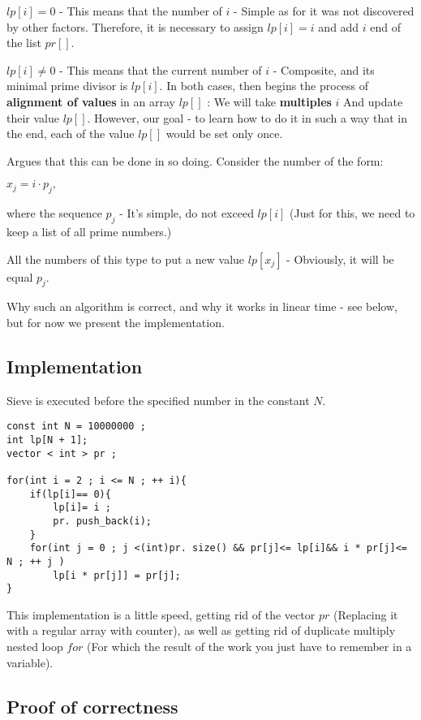 $lp [i] = 0$ - This means that the number of $i$ - Simple as for it was not discovered by other factors.
Therefore, it is necessary to assign $lp [i] = i$ and add $i$ end of the list $pr []$.

$lp [i] \ne 0$ - This means that the current number of $i$ - Composite, and its minimal prime divisor is $lp [i]$.
In both cases, then begins the process of \textbf{alignment of values} ​​in an array $lp []$ : We will take \textbf{multiples} $i$ And update their value $lp []$. However, our goal - to learn how to do it in such a way that in the end, each of the value $lp []$ would be set only once.

Argues that this can be done in so doing. Consider the number of the form:

$x_j = i \cdot p_j,$

where the sequence $p_j$ - It's simple, do not exceed $lp [i]$ (Just for this, we need to keep a list of all prime numbers.)

All the numbers of this type to put a new value $lp [x_j]$ - Obviously, it will be equal $p_j$.

Why such an algorithm is correct, and why it works in linear time - see below, but for now we present the implementation.

\subsection{ Implementation }

Sieve is executed before the specified number in the constant $N$.

\begin{verbatim}
const int N = 10000000 ;
int lp[N + 1];
vector < int > pr ;
 
for(int i = 2 ; i <= N ; ++ i){
    if(lp[i]== 0){
        lp[i]= i ;
        pr. push_back(i);
    }
    for(int j = 0 ; j <(int)pr. size() && pr[j]<= lp[i]&& i * pr[j]<= N ; ++ j )
        lp[i * pr[j]] = pr[j];
} 
\end{verbatim}
This implementation is a little speed, getting rid of the vector $pr$ (Replacing it with a regular array with counter), as well as getting rid of duplicate multiply nested loop $for$ (For which the result of the work you just have to remember in a variable).

\subsection{ Proof of correctness }

